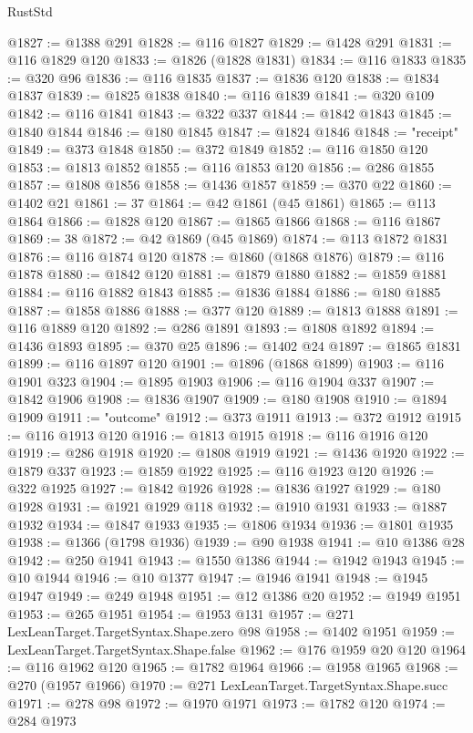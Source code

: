 \begin{lexlean}{RustStd}
\begin{coremodule}
@1827 := @1388 @291
@1828 := @116 @1827
@1829 := @1428 @291
@1831 := @116 @1829 @120
@1833 := @1826 (@1828 @1831)
@1834 := @116 @1833
@1835 := @320 @96
@1836 := @116 @1835
@1837 := @1836 @120
@1838 := @1834 @1837
@1839 := @1825 @1838
@1840 := @116 @1839
@1841 := @320 @109
@1842 := @116 @1841
@1843 := @322 @337
@1844 := @1842 @1843
@1845 := @1840 @1844
@1846 := @180 @1845
@1847 := @1824 @1846
@1848 := "receipt"
@1849 := @373 @1848
@1850 := @372 @1849
@1852 := @116 @1850 @120
@1853 := @1813 @1852
@1855 := @116 @1853 @120
@1856 := @286 @1855
@1857 := @1808 @1856
@1858 := @1436 @1857
@1859 := @370 @22
@1860 := @1402 @21
@1861 := 37
@1864 := @42 @1861 (@45 @1861)
@1865 := @113 @1864
@1866 := @1828 @120
@1867 := @1865 @1866
@1868 := @116 @1867
@1869 := 38
@1872 := @42 @1869 (@45 @1869)
@1874 := @113 @1872 @1831
@1876 := @116 @1874 @120
@1878 := @1860 (@1868 @1876)
@1879 := @116 @1878
@1880 := @1842 @120
@1881 := @1879 @1880
@1882 := @1859 @1881
@1884 := @116 @1882 @1843
@1885 := @1836 @1884
@1886 := @180 @1885
@1887 := @1858 @1886
@1888 := @377 @120
@1889 := @1813 @1888
@1891 := @116 @1889 @120
@1892 := @286 @1891
@1893 := @1808 @1892
@1894 := @1436 @1893
@1895 := @370 @25
@1896 := @1402 @24
@1897 := @1865 @1831
@1899 := @116 @1897 @120
@1901 := @1896 (@1868 @1899)
@1903 := @116 @1901 @323
@1904 := @1895 @1903
@1906 := @116 @1904 @337
@1907 := @1842 @1906
@1908 := @1836 @1907
@1909 := @180 @1908
@1910 := @1894 @1909
@1911 := "outcome"
@1912 := @373 @1911
@1913 := @372 @1912
@1915 := @116 @1913 @120
@1916 := @1813 @1915
@1918 := @116 @1916 @120
@1919 := @286 @1918
@1920 := @1808 @1919
@1921 := @1436 @1920
@1922 := @1879 @337
@1923 := @1859 @1922
@1925 := @116 @1923 @120
@1926 := @322 @1925
@1927 := @1842 @1926
@1928 := @1836 @1927
@1929 := @180 @1928
@1931 := @1921 @1929 @118
@1932 := @1910 @1931
@1933 := @1887 @1932
@1934 := @1847 @1933
@1935 := @1806 @1934
@1936 := @1801 @1935
@1938 := @1366 (@1798 @1936)
@1939 := @90 @1938
@1941 := @10 @1386 @28
@1942 := @250 @1941
@1943 := @1550 @1386
@1944 := @1942 @1943
@1945 := @10 @1944
@1946 := @10 @1377
@1947 := @1946 @1941
@1948 := @1945 @1947
@1949 := @249 @1948
@1951 := @12 @1386 @20
@1952 := @1949 @1951
@1953 := @265 @1951
@1954 := @1953 @131
@1957 := @271 LexLeanTarget.TargetSyntax.Shape.zero @98
@1958 := @1402 @1951
@1959 := LexLeanTarget.TargetSyntax.Shape.false
@1962 := @176 @1959 @20 @120
@1964 := @116 @1962 @120
@1965 := @1782 @1964
@1966 := @1958 @1965
@1968 := @270 (@1957 @1966)
@1970 := @271 LexLeanTarget.TargetSyntax.Shape.succ
@1971 := @278 @98
@1972 := @1970 @1971
@1973 := @1782 @120
@1974 := @284 @1973

\end{coremodule}
\end{lexlean}
